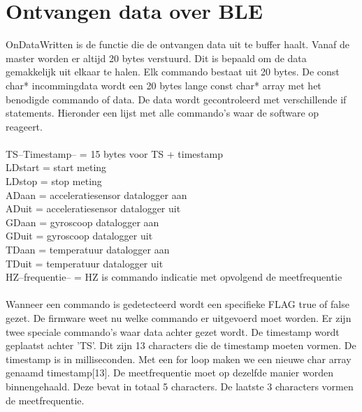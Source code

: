 \documentclass[12pt,a4paper]{report}
\begin{document}
\section{Ontvangen data over BLE}
OnDataWritten is de functie die de ontvangen data uit te buffer haalt. Vanaf de master worden er altijd 20 bytes verstuurd. Dit is bepaald om de data gemakkelijk uit elkaar te halen. Elk commando bestaat uit 20 bytes. De const char* incommingdata wordt een 20 bytes lange const char* array met het benodigde commando of data. De   data wordt gecontroleerd met verschillende if statements. Hieronder een lijst met alle commando's waar de software op reageert.\\\\TS--Timestamp-- = 15 bytes voor TS + timestamp\\LDstart = start meting\\ LDstop = stop meting\\ ADaan = acceleratiesensor datalogger aan\\ ADuit = acceleratiesensor datalogger uit\\ GDaan = gyroscoop datalogger aan\\ GDuit = gyroscoop datalogger uit\\ TDaan = temperatuur datalogger aan\\ TDuit = temperatuur datalogger uit\\ HZ--frequentie-- = HZ is commando indicatie met opvolgend de meetfrequentie\\\\Wanneer een commando is gedetecteerd wordt een specifieke FLAG true of false gezet. De firmware weet nu welke commando er uitgevoerd moet worden. Er zijn twee speciale commando's  waar data achter gezet wordt. De timestamp wordt geplaatst achter 'TS'. Dit zijn 13 characters die de timestamp moeten vormen. De timestamp is in milliseconden. Met een for loop maken we een nieuwe char array genaamd timestamp[13]. De meetfrequentie moet op dezelfde manier worden binnengehaald. Deze bevat in totaal 5 characters. De laatste 3 characters vormen de meetfrequentie.
\end{document}
